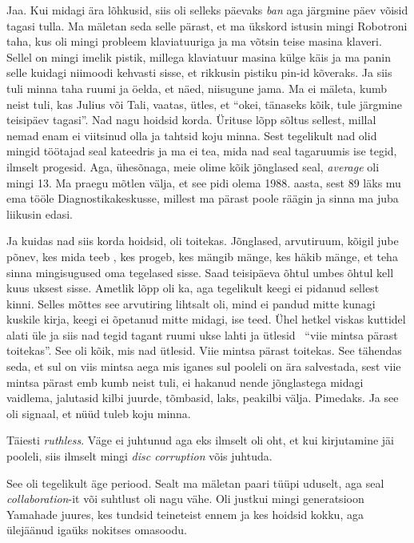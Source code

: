 Jaa. Kui midagi ära lõhkusid, siis oli selleks päevaks \emph{ban} aga järgmine 
päev võisid tagasi tulla. Ma mäletan seda selle pärast, et ma ükskord istusin 
mingi Robotroni taha, kus oli mingi probleem klaviatuuriga ja ma võtsin teise 
masina klaveri. Sellel on mingi imelik pistik, millega klaviatuur masina külge 
käis ja ma panin selle kuidagi niimoodi kehvasti sisse, et rikkusin pistiku 
pin-id  kõveraks. Ja siis tuli minna taha ruumi  
ja  öelda, et näed,  niisugune jama. Ma ei mäleta, kumb neist tuli, kas Julius 
või Tali, vaatas, ütles, et \enquote{okei, tänaseks kõik,  tule järgmine 
teisipäev tagasi}. Nad nagu hoidsid korda.  Ürituse  
 lõpp sõltus sellest, millal nemad enam ei viitsinud olla ja tahtsid 
koju minna. Sest tegelikult nad olid mingid töötajad seal kateedris ja ma ei 
tea, mida nad seal tagaruumis ise tegid, ilmselt progesid. Aga, ühesõnaga, meie 
olime kõik jõnglased seal, \emph{average} oli mingi 13. Ma praegu mõtlen välja, 
et see pidi olema 1988.  aasta, sest 89 läks mu ema tööle 
Diagnostikakeskusse, millest ma pärast poole räägin ja 
sinna ma juba liikusin edasi. 

Ja kuidas nad siis korda hoidsid, oli toitekas. Jõnglased, arvutiruum, kõigil jube 
põnev, kes mida teeb , kes progeb, kes mängib mänge, kes häkib mänge, et teha 
sinna mingisugused oma tegelased sisse. Saad teisipäeva õhtul umbes õhtul kell 
kuus uksest sisse. Ametlik lõpp oli ka, aga tegelikult keegi ei pidanud 
sellest kinni. Selles mõttes see arvutiring lihtsalt oli, mind ei pandud mitte 
kunagi kuskile kirja, keegi ei õpetanud mitte midagi, ise teed. Ühel hetkel 
viskas kuttidel alati üle ja siis nad tegid tagant ruumi ukse lahti ja ütlesid 
\enquote{viie mintsa pärast toitekas}. See oli kõik, mis nad ütlesid. Viie 
mintsa pärast toitekas. See tähendas seda, et sul on viis mintsa aega mis 
iganes sul pooleli on ära salvestada, sest viie mintsa pärast emb kumb neist  
tuli,  ei hakanud nende jõnglastega midagi vaidlema, jalutasid kilbi juurde, 
tõmbasid, laks, peakilbi välja. Pimedaks. Ja see oli signaal, et nüüd tuleb koju 
minna. 


Täiesti \emph{ruthless}. Väge ei juhtunud aga eks ilmselt oli oht, et kui 
kirjutamine jäi pooleli, siis ilmselt mingi \emph{disc corruption} võis 
juhtuda. 

See oli tegelikult äge periood. Sealt ma mäletan paari tüüpi uduselt, aga seal 
\emph{collaboration}-it või suhtlust oli nagu vähe. Oli justkui mingi 
generatsioon Yamahade juures, kes tundsid teineteist ennem ja kes hoidsid 
kokku, aga ülejäänud  igaüks  nokitses omasoodu. 


